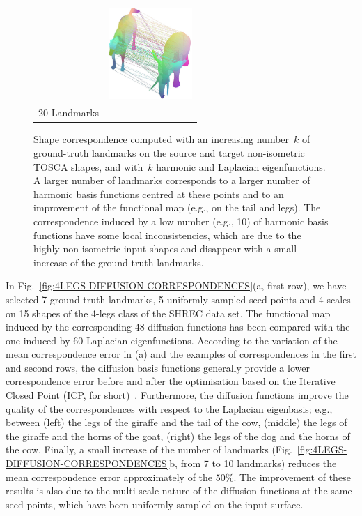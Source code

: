 \documentclass[acmtog,authorversion]{acmart}
\begin{document}
\begin{figure}[t]
\begin{tabular}{cc}
&\includegraphics[width=90pt]{FMAP-images/TOSCA-10LANDMARKS-10LAPLACIAN-HARMONIC-BASIS-F.jpg}\\
20 Landmarks &\\
\hline
\end{tabular}
\caption{Shape correspondence computed with an increasing number~$k$ of ground-truth landmarks on the source and target non-isometric TOSCA shapes, and with~$k$ harmonic and Laplacian eigenfunctions. A larger number of landmarks corresponds to a larger number of harmonic basis functions centred at these points and to an improvement of the functional map (e.g., on the tail and legs). The correspondence induced by a low number (e.g., 10) of harmonic basis functions have some local inconsistencies, which are due to the highly non-isometric input shapes and disappear with a small increase of the ground-truth landmarks.\label{fig:ELEPHANT-HORSE}}
\end{figure}

In Fig.~\ref{fig:4LEGS-DIFFUSION-CORRESPONDENCES}(a, first row), we have selected 7 ground-truth landmarks, 5 uniformly sampled seed points and 4 scales on 15 shapes of the 4-legs class of the SHREC data set. The functional map induced by the corresponding 48 diffusion functions has been compared with the one induced by 60 Laplacian eigenfunctions. According to the variation of the mean correspondence error in (a) and the examples of correspondences in the first and second rows, the diffusion basis functions generally provide a lower correspondence error before and after the optimisation based on the Iterative Closed Point (ICP, for short)~\citep{NOGNENG2017}. Furthermore, the diffusion functions improve the quality of the correspondences with respect to the Laplacian eigenbasis; e.g., between (left) the legs of the giraffe and the tail of the cow, (middle) the legs of the giraffe and the horns of the goat, (right) the legs of the dog and the horns of the cow. Finally, a small increase of the number of landmarks (Fig.~\ref{fig:4LEGS-DIFFUSION-CORRESPONDENCES}b, from 7 to 10 landmarks) reduces the mean correspondence error approximately of the \mbox{$50\%$}. The improvement of these results is also due to the multi-scale nature of the diffusion functions at the same seed points, which have been uniformly sampled on the input surface.
\end{document}
